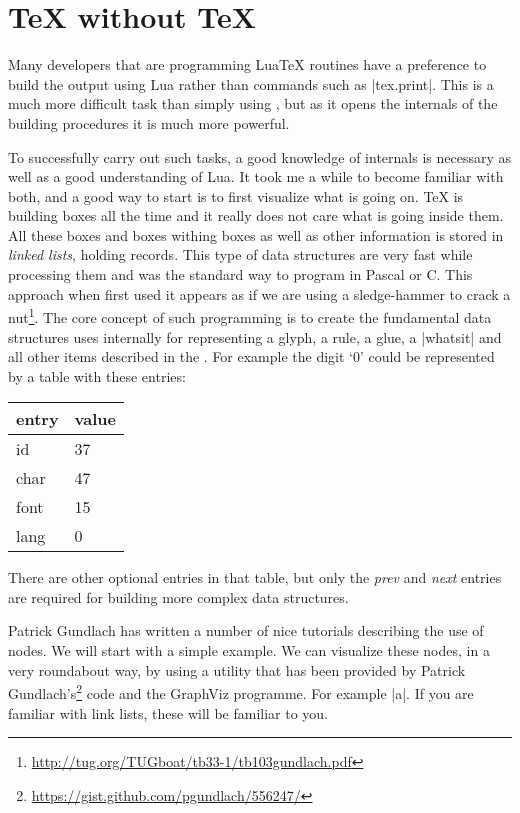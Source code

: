 \def\lstlua#1{\bgroup\noindent
     \color{blue}
     \textsf{#1}\par
     \egroup}
\chapter{TeX without TeX}

Many developers that are programming LuaTeX routines have a preference to  build the output using Lua rather than commands such as |tex.print|. This is a much more difficult task than simply using \tex, but as it opens the internals of the \tex building procedures it is much more powerful.

To successfully carry out such tasks, a good knowledge of \tex internals is necessary as well as a good understanding of Lua. It took me a while to become familiar with both, and a good way to start is to first visualize what is going on. TeX is building boxes all the time and it really does not care what is going inside them. All these boxes and boxes withing boxes as well as other information is stored in \textit{linked lists}, holding records. This type of data structures are very fast while processing them and was the standard way to program in Pascal or C. This approach when first used it appears as if we are using a sledge-hammer to crack a nut\footnote{\url{http://tug.org/TUGboat/tb33-1/tb103gundlach.pdf}}. The core concept of such programming is to create the fundamental data structures \tex uses internally for representing a glyph, a rule, a glue, a |whatsit| and all other items described in the \texbook. For example the digit `0' could be represented by a table with these entries:
\bigskip

\begin{center}
\begin{tabular}{ll}
\toprule
entry & value\\
\midrule
id  &37\\
char &47\\
font &15\\
lang &0\\
\bottomrule
\end{tabular}
\end{center}

There are other optional entries in that table, but only the \textit{prev} and \textit{next} entries are required for building more complex data structures.

\bigskip
Patrick Gundlach has written a number of nice tutorials describing the use of nodes. We will start with a simple example.  We can visualize these nodes, in a very roundabout way, by using a utility that has been provided by Patrick Gundlach's\footnote{\protect\url{https://gist.github.com/pgundlach/556247/}} code and the GraphViz programme. For example  |\hbox{a}|. If you are familiar with link lists, these will be familiar to you. 


